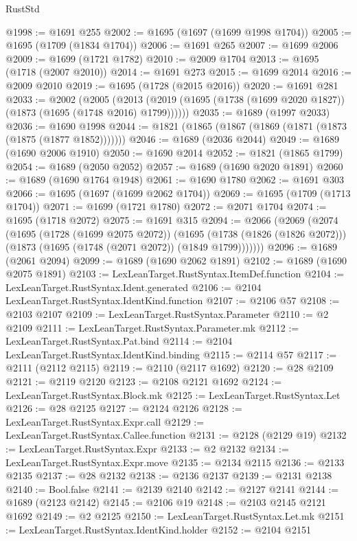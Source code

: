 \begin{lexlean}{RustStd}
\begin{coremodule}
@1998 := @1691 @255
@2002 := @1695 (@1697 (@1699 @1998 @1704))
@2005 := @1695 (@1709 (@1834 @1704))
@2006 := @1691 @265
@2007 := @1699 @2006
@2009 := @1699 (@1721 @1782)
@2010 := @2009 @1704
@2013 := @1695 (@1718 (@2007 @2010))
@2014 := @1691 @273
@2015 := @1699 @2014
@2016 := @2009 @2010
@2019 := @1695 (@1728 (@2015 @2016))
@2020 := @1691 @281
@2033 := @2002
    (@2005 (@2013 (@2019 (@1695 (@1738 (@1699 @2020 @1827)) (@1873 (@1695 (@1748 @2016) @1799))))))
@2035 := @1689 (@1997 @2033)
@2036 := @1690 @1998
@2044 := @1821 (@1865 (@1867 (@1869 (@1871 (@1873 (@1875 (@1877 @1852)))))))
@2046 := @1689 (@2036 @2044)
@2049 := @1689 (@1690 @2006 @1910)
@2050 := @1690 @2014
@2052 := @1821 (@1865 @1799)
@2054 := @1689 (@2050 @2052)
@2057 := @1689 (@1690 @2020 @1891)
@2060 := @1689 (@1690 @1764 @1948)
@2061 := @1690 @1780
@2062 := @1691 @303
@2066 := @1695 (@1697 (@1699 @2062 @1704))
@2069 := @1695 (@1709 (@1713 @1704))
@2071 := @1699 (@1721 @1780)
@2072 := @2071 @1704
@2074 := @1695 (@1718 @2072)
@2075 := @1691 @315
@2094 := @2066
    (@2069
      (@2074
        (@1695
          (@1728 (@1699 @2075 @2072))
          (@1695
            (@1738 (@1826 (@1826 @2072)))
            (@1873 (@1695 (@1748 (@2071 @2072)) (@1849 @1799)))))))
@2096 := @1689 (@2061 @2094)
@2099 := @1689 (@1690 @2062 @1891)
@2102 := @1689 (@1690 @2075 @1891)
@2103 := LexLeanTarget.RustSyntax.ItemDef.function
@2104 := LexLeanTarget.RustSyntax.Ident.generated
@2106 := @2104 LexLeanTarget.RustSyntax.IdentKind.function
@2107 := @2106 @57
@2108 := @2103 @2107
@2109 := LexLeanTarget.RustSyntax.Parameter
@2110 := @2 @2109
@2111 := LexLeanTarget.RustSyntax.Parameter.mk
@2112 := LexLeanTarget.RustSyntax.Pat.bind
@2114 := @2104 LexLeanTarget.RustSyntax.IdentKind.binding
@2115 := @2114 @57
@2117 := @2111 (@2112 @2115)
@2119 := @2110 (@2117 @1692)
@2120 := @28 @2109
@2121 := @2119 @2120
@2123 := @2108 @2121 @1692
@2124 := LexLeanTarget.RustSyntax.Block.mk
@2125 := LexLeanTarget.RustSyntax.Let
@2126 := @28 @2125
@2127 := @2124 @2126
@2128 := LexLeanTarget.RustSyntax.Expr.call
@2129 := LexLeanTarget.RustSyntax.Callee.function
@2131 := @2128 (@2129 @19)
@2132 := LexLeanTarget.RustSyntax.Expr
@2133 := @2 @2132
@2134 := LexLeanTarget.RustSyntax.Expr.move
@2135 := @2134 @2115
@2136 := @2133 @2135
@2137 := @28 @2132
@2138 := @2136 @2137
@2139 := @2131 @2138
@2140 := Bool.false
@2141 := @2139 @2140
@2142 := @2127 @2141
@2144 := @1689 (@2123 @2142)
@2145 := @2106 @19
@2148 := @2103 @2145 @2121 @1692
@2149 := @2 @2125
@2150 := LexLeanTarget.RustSyntax.Let.mk
@2151 := LexLeanTarget.RustSyntax.IdentKind.holder
@2152 := @2104 @2151

\end{coremodule}
\end{lexlean}
